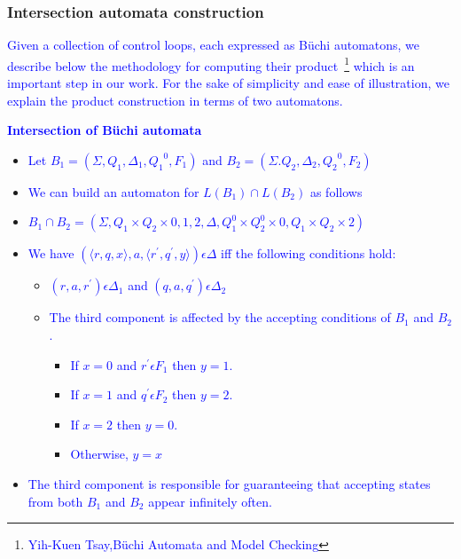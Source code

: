 \begin{frame}
\frametitle{Intersection automata construction}

\tiny{\textcolor{blue}{Given a collection of control loops, each expressed as B\"{u}chi automatons, we describe below 
the methodology for computing their product~\footnote{\tiny {\textcolor{blue}{Yih-Kuen Tsay,B\"{u}chi Automata and Model Checking}}}%
which is an important step in our work. For the sake of simplicity and ease of illustration, 
we explain the product construction in terms of two automatons.}}

\tiny{\textcolor{blue}{\bf Intersection of B\"{u}chi automata}}
\begin{itemize}
 \item \tiny{\textcolor{blue}{Let $B_1 = (\Sigma,Q_1,\Delta_1,{Q_1}^0,F_1)$ and $B_2 = (\Sigma.Q_2,\Delta_2,{Q_2}^0,F_2)$}}
 \item \tiny{\textcolor{blue}{We can build an automaton for $L(B_1)\cap L(B_2)$ as follows}}
 \item \tiny{\textcolor{blue}{$B_1 \cap B_2 = (\Sigma, Q_1 \times Q_2 \times {0,1,2},\Delta, Q^0_1 \times Q^0_2 \times
       {0}, Q_1 \times Q_2 \times {2})$}}
 \item \tiny{\textcolor{blue}{We have $(\langle r,q,x \rangle,a,\langle r^{'},q^{'},y \rangle) \epsilon \Delta$ iff the 
       following conditions hold:}}
        \begin{itemize}
          \item \tiny{\textcolor{blue}{$(r,a,r^{'}) \epsilon \Delta_1$ and $ (q,a,q^{'}) \epsilon \Delta_2$}}
          \item \tiny{\textcolor{blue}{The third component is affected by the accepting conditions of $B_1$ and $B_2$.}}
            \begin{itemize}
             \item \tiny{\textcolor{blue}{If $x = 0$ and $r^{'} \epsilon F_1$ then $y = 1$.}}
             \item \tiny{\textcolor{blue}{If $x = 1$ and $q^{'} \epsilon F_2$ then $y = 2$.}}
             \item \tiny{\textcolor{blue}{If $x = 2$ then $y = 0$.}}
             \item \tiny{\textcolor{blue}{Otherwise, $y = x$}}
            \end{itemize}

        \end{itemize}
 \item \tiny{\textcolor{blue}{The third component is responsible for guaranteeing that accepting states from both $B_1$ and
       $B_2$ appear infinitely often.}}
\end{itemize}


\end{frame}